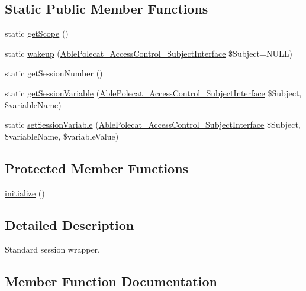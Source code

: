 \subsection*{Static Public Member Functions}
\begin{DoxyCompactItemize}
\item 
static \hyperlink{class_able_polecat___session_ad9ade868bd136d32967059d1cccb3e92}{get\+Scope} ()
\item 
static \hyperlink{class_able_polecat___session_a3f2135f6ad45f51d075657f6d20db2cd}{wakeup} (\hyperlink{interface_able_polecat___access_control___subject_interface}{Able\+Polecat\+\_\+\+Access\+Control\+\_\+\+Subject\+Interface} \$Subject=N\+U\+L\+L)
\item 
static \hyperlink{class_able_polecat___session_aec7157d76bfc0a3a0f577f90fae7bc33}{get\+Session\+Number} ()
\item 
static \hyperlink{class_able_polecat___session_a8b8c4e7cd29f54e85cbde74c21f22250}{get\+Session\+Variable} (\hyperlink{interface_able_polecat___access_control___subject_interface}{Able\+Polecat\+\_\+\+Access\+Control\+\_\+\+Subject\+Interface} \$Subject, \$variable\+Name)
\item 
static \hyperlink{class_able_polecat___session_aa518ae714a59feda52322b4a27283ba8}{set\+Session\+Variable} (\hyperlink{interface_able_polecat___access_control___subject_interface}{Able\+Polecat\+\_\+\+Access\+Control\+\_\+\+Subject\+Interface} \$Subject, \$variable\+Name, \$variable\+Value)
\end{DoxyCompactItemize}
\subsection*{Protected Member Functions}
\begin{DoxyCompactItemize}
\item 
\hyperlink{class_able_polecat___session_a91098fa7d1917ce4833f284bbef12627}{initialize} ()
\end{DoxyCompactItemize}


\subsection{Detailed Description}
Standard session wrapper. 

\subsection{Member Function Documentation}
\hypertarget{class_able_polecat___session_aaec5812f6b4eb6835f88d3baa06a002a}{}
